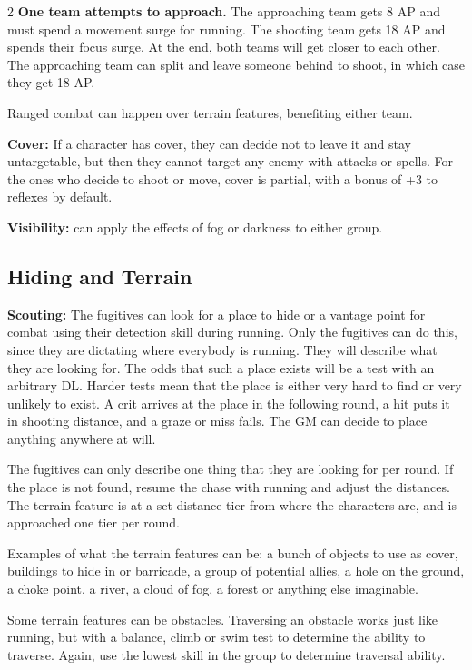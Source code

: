 \begin{multicols}{2}
\textbf{One team attempts to approach.} The approaching team gets 8 AP and must spend a movement surge for running. The shooting team gets 18 AP and spends their focus surge. At the end, both teams will get closer to each other. The approaching team can split and leave someone behind to shoot, in which case they get 18 AP. 

Ranged combat can happen over terrain features, benefiting either team.

\textbf{Cover:} If a character has cover, they can decide not to leave it and stay untargetable, but then they cannot target any enemy with attacks or spells. For the ones who decide to shoot or move, cover is partial, with a bonus of +3 to reflexes by default.

\textbf{Visibility:} can apply the effects of fog or darkness to either group. 


\subsection{Hiding and Terrain}

\textbf{Scouting:} The fugitives can look for a place to hide or a vantage point for combat using their detection skill during running. Only the fugitives can do this, since they are dictating where everybody is running. They will describe what they are looking for. The odds that such a place exists will be a test with an arbitrary DL. Harder tests mean that the place is either very hard to find or very unlikely to exist. A crit arrives at the place in the following round, a hit puts it in shooting distance, and a graze or miss fails. The GM can decide to place anything anywhere at will. 

The fugitives can only describe one thing that they are looking for per round. If the place is not found, resume the chase with running and adjust the distances. The terrain feature is at a set distance tier from where the characters are, and is approached one tier per round. 

Examples of what the terrain features can be: a bunch of objects to use as cover, buildings to hide in or barricade, a group of potential allies, a hole on the ground, a choke point, a river, a cloud of fog, a forest or anything else imaginable.

Some terrain features can be obstacles. Traversing an obstacle works just like running, but with a balance, climb or swim test to determine the ability to traverse. Again, use the lowest skill in the group to determine traversal ability.


\end{multicols}
